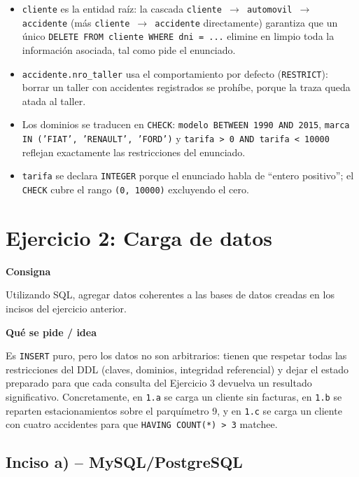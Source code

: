 \documentclass[11pt,a4paper]{article}
\newcommand{\itemcabecera}[1]{\noindent\textbf{#1}\par\medskip}
\newcommand{\bloqueConsigna}{\itemcabecera{Consigna}}
\newcommand{\bloqueIdea}{\itemcabecera{Qu\'e se pide / idea}}
\begin{document}
\begin{itemize}
    \item \texttt{cliente} es la entidad raíz: la cascada \texttt{cliente $\to$ automovil $\to$ accidente} (más \texttt{cliente $\to$ accidente} directamente) garantiza que un único \texttt{DELETE FROM cliente WHERE dni = ...} elimine en limpio toda la información asociada, tal como pide el enunciado.
    \item \texttt{accidente.nro\_taller} usa el comportamiento por defecto (\texttt{RESTRICT}): borrar un taller con accidentes registrados se prohíbe, porque la traza queda atada al taller.
    \item Los dominios se traducen en \texttt{CHECK}: \texttt{modelo BETWEEN 1990 AND 2015}, \texttt{marca IN ('FIAT', 'RENAULT', 'FORD')} y \texttt{tarifa > 0 AND tarifa < 10000} reflejan exactamente las restricciones del enunciado.
    \item \texttt{tarifa} se declara \texttt{INTEGER} porque el enunciado habla de ``entero positivo''; el \texttt{CHECK} cubre el rango \texttt{(0, 10000)} excluyendo el cero.
\end{itemize}

\section{Ejercicio 2: Carga de datos}

\bloqueConsigna

Utilizando SQL, agregar datos coherentes a las bases de datos creadas en los incisos del ejercicio anterior.

\bloqueIdea

Es \texttt{INSERT} puro, pero los datos no son arbitrarios: tienen que respetar todas las restricciones del DDL (claves, dominios, integridad referencial) y dejar el estado preparado para que cada consulta del Ejercicio 3 devuelva un resultado significativo. Concretamente, en \texttt{1.a} se carga un cliente sin facturas, en \texttt{1.b} se reparten estacionamientos sobre el parquímetro 9, y en \texttt{1.c} se carga un cliente con cuatro accidentes para que \texttt{HAVING COUNT(*) > 3} matchee.

\subsection{Inciso a) -- MySQL/PostgreSQL}
\end{document}
